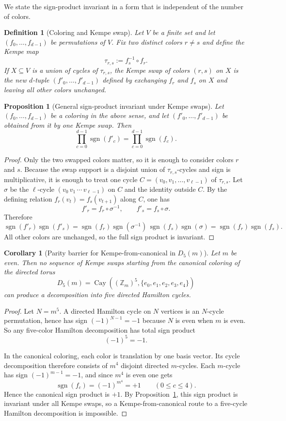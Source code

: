 \documentclass[11pt]{article}
\newtheorem{proposition}{Proposition}
\newtheorem{corollary}{Corollary}
\newtheorem{definition}{Definition}
\newcommand{\sgn}{\operatorname{sgn}}
\begin{document}
We state the sign-product invariant in a form that is independent of the number
of colors.

\begin{definition}[Coloring and Kempe swap]
Let $V$ be a finite set and let $(f_0,\dots,f_{d-1})$ be permutations of $V$.
Fix two distinct colors $r\neq s$ and define the Kempe map
\[
\tau_{r,s}:=f_s^{-1}\circ f_r.
\]
If $X\subseteq V$ is a union of cycles of $\tau_{r,s}$, the \emph{Kempe swap}
of colors $(r,s)$ on $X$ is the new $d$-tuple $(f'_0,\dots,f'_{d-1})$ defined
by exchanging $f_r$ and $f_s$ on $X$ and leaving all other colors unchanged.
\end{definition}

\begin{proposition}[General sign-product invariant under Kempe swaps]
\label{prop:signinv}
Let $(f_0,\dots,f_{d-1})$ be a coloring in the above sense, and let
$(f'_0,\dots,f'_{d-1})$ be obtained from it by one Kempe swap. Then
\[
\prod_{c=0}^{d-1} \sgn(f'_c)
=
\prod_{c=0}^{d-1} \sgn(f_c).
\]
\end{proposition}

\begin{proof}
Only the two swapped colors matter, so it is enough to consider colors $r$ and
$s$. Because the swap support is a disjoint union of $\tau_{r,s}$-cycles and
sign is multiplicative, it is enough to treat one cycle
$C=(v_0,v_1,\dots,v_{\ell-1})$ of $\tau_{r,s}$. Let $\sigma$ be the $\ell$-cycle
$(v_0\,v_1\,\cdots\,v_{\ell-1})$ on $C$ and the identity outside $C$.
By the defining relation $f_r(v_t)=f_s(v_{t+1})$ along $C$, one has
\[
 f'_r = f_r\circ\sigma^{-1},
 \qquad
 f'_s = f_s\circ\sigma.
\]
Therefore
\[
\sgn(f'_r)\sgn(f'_s)
=
\sgn(f_r)\sgn(\sigma^{-1})\,\sgn(f_s)\sgn(\sigma)
=
\sgn(f_r)\sgn(f_s).
\]
All other colors are unchanged, so the full sign product is invariant.
\end{proof}

\begin{corollary}[Parity barrier for Kempe-from-canonical in $D_5(m)$]
\label{cor:d5barrier}
Let $m$ be even. Then no sequence of Kempe swaps starting from the canonical
coloring of the directed torus
\[
D_5(m)=\operatorname{Cay}((\mathbb Z_m)^5,\{e_0,e_1,e_2,e_3,e_4\})
\]
can produce a decomposition into five directed Hamilton cycles.
\end{corollary}

\begin{proof}
Let $N=m^5$. A directed Hamilton cycle on $N$ vertices is an $N$-cycle
permutation, hence has sign $(-1)^{N-1}=-1$ because $N$ is even when $m$ is
even. So any five-color Hamilton decomposition has total sign product
\[
(-1)^5=-1.
\]

In the canonical coloring, each color is translation by one basis vector. Its
cycle decomposition therefore consists of $m^4$ disjoint directed $m$-cycles.
Each $m$-cycle has sign $(-1)^{m-1}=-1$, and since $m^4$ is even one gets
\[
\sgn(f_c)=(-1)^{m^4}=+1
\qquad (0\le c\le 4).
\]
Hence the canonical sign product is $+1$. By
Proposition~\ref{prop:signinv}, this sign product is invariant under all Kempe
swaps, so a Kempe-from-canonical route to a five-cycle Hamilton decomposition
is impossible.
\end{proof}
\end{document}

